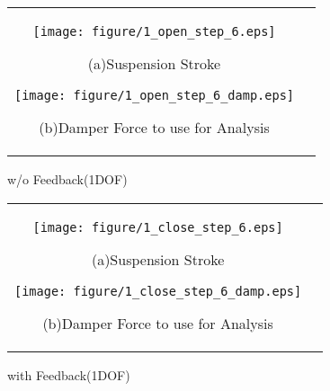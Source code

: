 \documentclass[a4paper,12pt]{article_vdlab_sotsuron}
\begin{document}
\newpage
\begin{figure}[htp]
  \begin{tabular}{cc}
  \begin{minipage}{0.5\hsize}
  \begin{center} 
    \texttt{[image: figure/1\_open\_step\_6.eps]}
    \end{center}
    \begin{center}
    \vspace*{3mm}
    \ (a)Suspension Stroke\
    \end{center}
  \end{minipage}
  \begin{minipage}{0.5\hsize}
     \begin{center}
      \texttt{[image: figure/1\_open\_step\_6\_damp.eps]}
      \end{center}
      \begin{center}
      \vspace*{3mm}
      \ (b)Damper Force to use for Analysis\
    \end{center}
  \end{minipage}
  \end{tabular}
  \vspace*{3mm}
  \caption{w/o Feedback(1DOF)}
    \label{fig:1_wo_feedback}
\end{figure}

\vspace*{10mm}
\begin{figure}[htp]
  \begin{tabular}{cc}
  \begin{minipage}{0.5\hsize}
  \begin{center} 
    \texttt{[image: figure/1\_close\_step\_6.eps]}
    \end{center}
    \begin{center}
    \vspace*{3mm}
    \ (a)Suspension Stroke\
    \end{center}
  \end{minipage}
  \begin{minipage}{0.5\hsize}
     \begin{center}
      \texttt{[image: figure/1\_close\_step\_6\_damp.eps]}
      \end{center}
      \begin{center}
      \vspace*{3mm}
      \ (b)Damper Force to use for Analysis\
    \end{center}
  \end{minipage}
  \end{tabular}
  \vspace*{3mm}
  \caption{with Feedback(1DOF)}
    \label{fig:1_with_feedback}
\end{figure}
\end{document}
